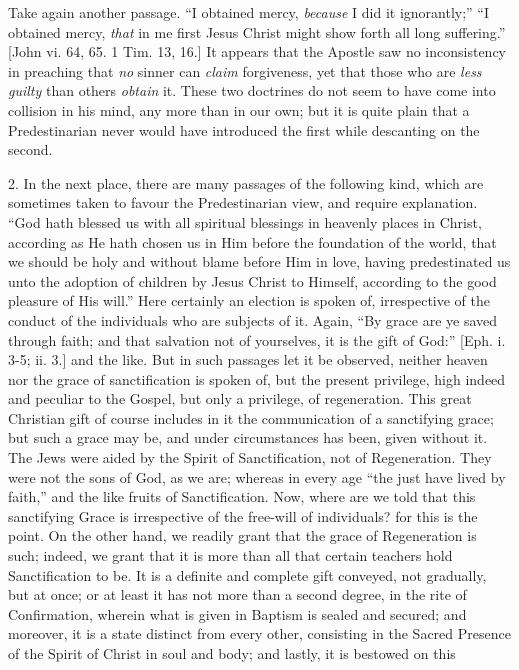 Take again another passage. ``I obtained mercy, \emph{because} I
did it ignorantly;'' ``I obtained mercy, \emph{that} in me first Jesus
Christ might show forth all long suffering.'' [John vi. 64, 65. 1
Tim. 13, 16.] It appears that the Apostle saw no inconsistency in
preaching that \emph{no} sinner can \emph{claim} forgiveness, yet that those who are \emph{less
guilty} than others \emph{obtain} it. These two doctrines do not seem
to have come into collision in his mind, any more than in our own; but
it is quite plain that a Predestinarian never would have introduced the
first while descanting on the second.

2. In the next place, there are many passages of the following kind,
which are sometimes taken to favour the Predestinarian view, and require
explanation. ``God hath blessed us with all spiritual blessings in
heavenly places in Christ, according as He hath chosen us in Him before
the foundation of the world, that we should be holy and without blame
before Him in love, having predestinated us unto the adoption of
children by Jesus Christ to Himself, according to the good pleasure of
His will.'' Here certainly an election is spoken of, irrespective of
the conduct of the individuals who are subjects of it. Again, ``By
grace are ye saved through faith; and that salvation not of yourselves,
it is the gift of God:'' [Eph. i. 3-5; ii. 3.] and the like. But in
such passages let it be observed, neither heaven nor the grace of
sanctification is spoken of, but the present privilege, high indeed and
peculiar to the Gospel, but only a privilege, of regeneration. This
great Christian gift of course includes in it the communication of a
sanctifying grace; but such a grace may be, and under circumstances has
been, given without it. The Jews were aided by the Spirit of
Sanctification, not of Regeneration. They were not the sons of God, as
we are; whereas in every age ``the just have lived by faith,''
and the like fruits of Sanctification. Now, where are we told that this
sanctifying Grace is irrespective of the free-will of individuals? for
this is the point. On the other hand, we readily grant that the grace of
Regeneration is such; indeed, we grant that it is more than all that
certain teachers hold Sanctification to be. It is a definite and
complete gift conveyed, not gradually, but at once; or at least it has
not more than a second degree, in the rite of Confirmation, wherein what
is given in Baptism is sealed and secured; and moreover, it is a state
distinct from every other, consisting in the Sacred Presence of the
Spirit of Christ in soul and body; and lastly, it is bestowed on this
